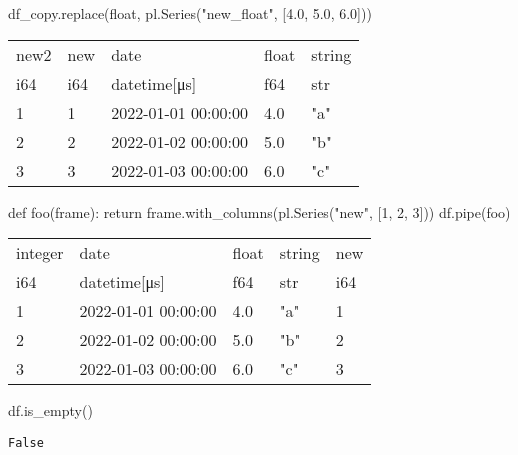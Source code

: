 \documentclass[
  letterpaper,
  DIV=11,
  numbers=noendperiod]{scrartcl}
\newenvironment{Shaded}{\begin{snugshade}}{\end{snugshade}}
\newcommand{\ControlFlowTok}[1]{\textcolor[rgb]{0.00,0.23,0.31}{#1}}
\newcommand{\DecValTok}[1]{\textcolor[rgb]{0.68,0.00,0.00}{#1}}
\newcommand{\FloatTok}[1]{\textcolor[rgb]{0.68,0.00,0.00}{#1}}
\newcommand{\KeywordTok}[1]{\textcolor[rgb]{0.00,0.23,0.31}{#1}}
\newcommand{\NormalTok}[1]{\textcolor[rgb]{0.00,0.23,0.31}{#1}}
\newcommand{\StringTok}[1]{\textcolor[rgb]{0.13,0.47,0.30}{#1}}
\begin{document}
\begin{Shaded}
\begin{Highlighting}[]
\NormalTok{df\_copy.replace(}\StringTok{\textquotesingle{}float\textquotesingle{}}\NormalTok{, pl.Series(}\StringTok{"new\_float"}\NormalTok{, [}\FloatTok{4.0}\NormalTok{, }\FloatTok{5.0}\NormalTok{, }\FloatTok{6.0}\NormalTok{])) }
\end{Highlighting}
\end{Shaded}

\begin{longtable}[]{@{}lllll@{}}
\toprule()
new2 & new & date & float & string \\
i64 & i64 & datetime{[}μs{]} & f64 & str \\
\midrule()
\endhead
1 & 1 & 2022-01-01 00:00:00 & 4.0 & "a" \\
2 & 2 & 2022-01-02 00:00:00 & 5.0 & "b" \\
3 & 3 & 2022-01-03 00:00:00 & 6.0 & "c" \\
\bottomrule()
\end{longtable}

\begin{Shaded}
\begin{Highlighting}[]
\KeywordTok{def}\NormalTok{ foo(frame):}
  \ControlFlowTok{return}\NormalTok{ frame.with\_columns(pl.Series(}\StringTok{"new"}\NormalTok{, [}\DecValTok{1}\NormalTok{, }\DecValTok{2}\NormalTok{, }\DecValTok{3}\NormalTok{]))}
\NormalTok{df.pipe(foo)}
\end{Highlighting}
\end{Shaded}

\begin{longtable}[]{@{}lllll@{}}
\toprule()
integer & date & float & string & new \\
i64 & datetime{[}μs{]} & f64 & str & i64 \\
\midrule()
\endhead
1 & 2022-01-01 00:00:00 & 4.0 & "a" & 1 \\
2 & 2022-01-02 00:00:00 & 5.0 & "b" & 2 \\
3 & 2022-01-03 00:00:00 & 6.0 & "c" & 3 \\
\bottomrule()
\end{longtable}

\begin{Shaded}
\begin{Highlighting}[]
\NormalTok{df.is\_empty()}
\end{Highlighting}
\end{Shaded}

\begin{verbatim}
False
\end{verbatim}
\end{document}
